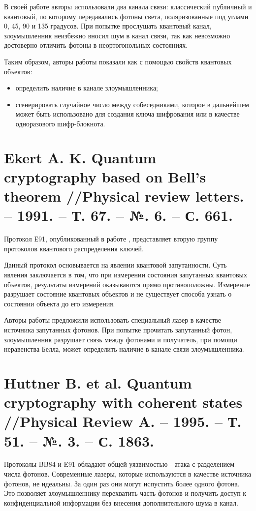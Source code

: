 В своей работе авторы использовали два канала связи: классический публичный и квантовый, по которому передавались фотоны света, поляризованные под углами 0, 45, 90 и 135 градусов. При попытке прослушать квантовый канал, злоумышленник неизбежно вносил шум в канал связи, так как невозможно достоверно отличить фотоны в неортогонольных состояниях.

Таким образом, авторы работы показали как с помощью свойств квантовых объектов:
\begin{itemize}
	\item определить наличие в канале злоумышленника;
	\item сгенерировать случайное число между собеседниками, которое в дальнейшем может быть использовано для создания ключа шифрования или в качестве одноразового шифр-блокнота.
\end{itemize}

\section{Ekert A. K. Quantum cryptography based on Bell’s theorem //Physical review letters. – 1991. – Т. 67. – №. 6. – С. 661.}
Протокол Е91, опубликованный в работе \cite{ekert1991quantum}, представляет вторую группу протоколов квантового распределения ключей.

Данный протокол основывается на явлении квантовой запутанности. Суть явления заключается в том, что при измерении состояния запутанных квантовых объектов, результаты измерений оказываются прямо противоположны. Измерение разрушает состояние квантовых объектов и не существует способа узнать о состоянии объекта до его измерения.

Авторы работы предложили использовать специальный лазер в качестве источника запутанных фотонов. При попытке прочитать запутанный фотон, злоумышленник разрушает связь между фотонами и получатель, при помощи неравенства Белла, может определить наличие в канале связи злоумышленника.


\section{Huttner B. et al. Quantum cryptography with coherent states //Physical Review A. – 1995. – Т. 51. – №. 3. – С. 1863.}
Протоколы BB84 и E91 обладают общей уязвимостью - атака с разделением числа фотонов. Современные лазеры, которые используются в качестве источника фотонов, не идеальны. За один раз они могут испустить более одного фотона. Это позволяет злоумышленнику перехватить часть фотонов и получить доступ к конфиденциальной информации без внесения дополнительного шума в канал.

